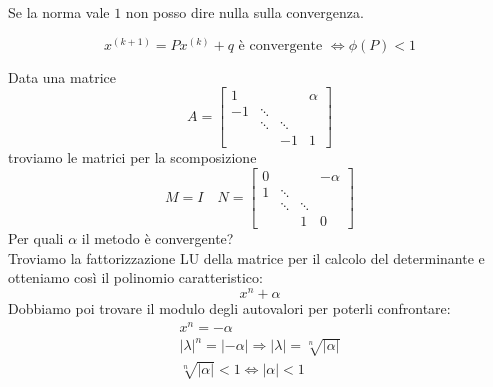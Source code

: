 \begin{note}
	Se la norma vale $1$ non posso dire nulla sulla convergenza.
\end{note}

\begin{theorem}
	\begin{equation}
		x^{(k+1)} = Px^{(k)}+q \text{ è convergente } \Leftrightarrow \phi(P)<1
	\end{equation}
\end{theorem}

\begin{example}
		Data una matrice
	\begin{equation*}
		A = \begin{bmatrix}
			1 & & & \alpha\\ 
			-1 & \ddots &  & \\
			& \ddots & \ddots &\\
			& & -1 & 1
		\end{bmatrix}
	\end{equation*}
	troviamo le matrici per la scomposizione
	\begin{equation*}
		M=I \quad
		N = \begin{bmatrix}
			0 & &  & -\alpha\\ 
			1& \ddots & &\\
			 & \ddots & \ddots &\\
			&& 1 & 0
		\end{bmatrix}
	\end{equation*}
	Per quali $\alpha$ il metodo è convergente? \\
	Troviamo la fattorizzazione LU della matrice per il calcolo del determinante e otteniamo così il polinomio caratteristico:
	\begin{equation*}
		x^n + \alpha
	\end{equation*}
	Dobbiamo poi trovare il modulo degli autovalori per poterli confrontare:
	\begin{equation*}
		\begin{split}
			x^n=-\alpha \\
			\lvert\lambda\rvert^n = \lvert -\alpha \rvert \Rightarrow \lvert \lambda \rvert = \sqrt[n]{\lvert \alpha \rvert} \\
			\sqrt[n]{\lvert \alpha \rvert} < 1 \Leftrightarrow \lvert \alpha \rvert < 1
		\end{split}
	\end{equation*}
\end{example}